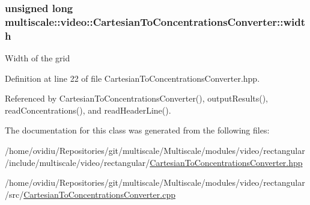 \hypertarget{classmultiscale_1_1video_1_1CartesianToConcentrationsConverter_ae6fba5af405d884c7b70ed206a6d5cb1}{
\subsubsection[{width}]{\setlength{\rightskip}{0pt plus 5cm}unsigned long {\bf multiscale\-::video\-::\-Cartesian\-To\-Concentrations\-Converter\-::width}}}\label{classmultiscale_1_1video_1_1CartesianToConcentrationsConverter_ae6fba5af405d884c7b70ed206a6d5cb1}
\-Width of the grid 

\-Definition at line 22 of file \-Cartesian\-To\-Concentrations\-Converter.\-hpp.



\-Referenced by \-Cartesian\-To\-Concentrations\-Converter(), output\-Results(), read\-Concentrations(), and read\-Header\-Line().



\-The documentation for this class was generated from the following files\-:\begin{DoxyCompactItemize}
\item 
/home/ovidiu/\-Repositories/git/multiscale/\-Multiscale/modules/video/rectangular/include/multiscale/video/rectangular/\hyperlink{CartesianToConcentrationsConverter_8hpp}{\-Cartesian\-To\-Concentrations\-Converter.\-hpp}\item 
/home/ovidiu/\-Repositories/git/multiscale/\-Multiscale/modules/video/rectangular/src/\hyperlink{CartesianToConcentrationsConverter_8cpp}{\-Cartesian\-To\-Concentrations\-Converter.\-cpp}\end{DoxyCompactItemize}

